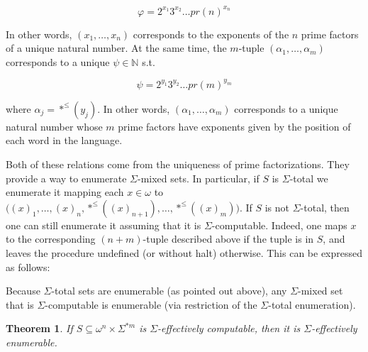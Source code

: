 \documentclass[a4paper, 12pt]{article}
\newtheorem{theorem}{Theorem}
\newtheorem{theorem}{Theorem}
\begin{document}
$$
\varphi = 2^{x_1}3^{x_2} \ldots pr(n)^{x_n}
$$

In other words, $(x_1, \ldots, x_n)$ corresponds to the exponents of the $n$
prime factors of a unique natural number. At the same time, the $m$-tuple
$(\alpha_1, \ldots, \alpha_m)$ corresponds to a unique $\psi \in \mathbb{N}$
s.t. 

$$
\psi = 2^{y_1}3^{y_2}\ldots pr(m)^{y_m}
$$

where $\alpha_j = *^{\leq}(y_j)$. In other words, $(\alpha_1, \ldots, \alpha_m)$
corresponds to a unique natural number whose $m$ prime factors have exponents
given by the position of each word in the language.

Both of these relations come from the uniqueness of prime factorizations.
They provide a way to enumerate $\Sigma$-mixed sets. In
particular, if $S$ is $\Sigma$-total we enumerate it mapping each $x \in \omega$
to $\big((x)_1, \ldots, (x)_n, *^{\leq}((x)_{n+1}), \ldots, *^{\leq}((x)_m)\big)$. If
$S$ is not $\Sigma$-total, then one can still enumerate it assuming that it is
$\Sigma$-computable. Indeed, one maps $x$ to the corresponding $(n+m)$-tuple
described above if the tuple is in $S$, and leaves the procedure undefined (or
without halt) otherwise. This can be expressed as follows:

Because $\Sigma$-total sets are enumerable (as pointed out above), any
$\Sigma$-mixed set that is $\Sigma$-computable is enumerable (via restriction
of the $\Sigma$-total enumeration).

\begin{theorem}
    If $S \subseteq \omega^{n} \times \Sigma^{*m} $ is $\Sigma$-effectively
    computable, then it is $\Sigma$-effectively enumerable.
\end{theorem}
\end{document}
